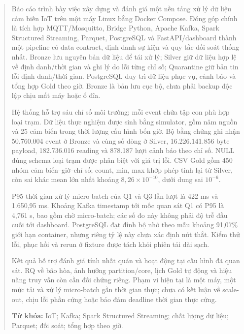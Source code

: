 \begin{abstract}
Báo cáo trình bày việc xây dựng và đánh giá một nền tảng xử lý dữ liệu cảm
biến IoT trên một máy Linux bằng Docker Compose. Đóng góp chính là tích hợp
MQTT/Mosquitto, Bridge Python, Apache Kafka, Spark Structured Streaming,
Parquet, PostgreSQL và FastAPI/dashboard thành một pipeline có data
contract, định danh sự kiện và quy tắc đối soát thống nhất. Bronze lưu
nguyên bản dữ liệu để tái xử lý; Silver giữ dữ liệu hợp lệ về định danh/thời
gian và ghi lý do lỗi từng chỉ số; Quarantine giữ bản tin lỗi định danh/thời
gian. PostgreSQL duy trì dữ liệu phục vụ, cảnh báo và tổng hợp Gold theo giờ.
Bronze là bản lưu cục bộ, chưa phải backup độc lập chịu mất máy hoặc ổ đĩa.

Hệ thống hỗ trợ sáu chỉ số môi trường; mỗi event chứa tập con phù hợp loại
trạm. Dữ liệu thực nghiệm được sinh bằng simulator, gồm năm nguồn và
25 cảm biến trong thời lượng cấu hình bốn giờ. Bộ bằng chứng ghi nhận
50.760.004 event ở Bronze và cùng số dòng ở Silver, 16.226.141.856 byte
payload, 182.736.016 reading và 878.187 lượt cảnh báo theo chỉ số. NULL
đúng schema loại trạm được phân biệt với giá trị lỗi. CSV Gold gồm
450 nhóm cảm biến--giờ--chỉ số; count, min, max khớp phép tính lại từ Silver,
còn sai khác mean lớn nhất khoảng $8,26\times10^{-10}$, dưới dung sai $10^{-6}$.

P95 thời gian xử lý micro-batch của Q1 và Q3 lần lượt là 422 ms và
1.650,95 ms. Khoảng Kafka timestamp tới mốc quan sát Q1 có P95 là 4,761 s,
bao gồm chờ micro-batch; các số đo này không phải độ trễ đầu cuối tới
dashboard. PostgreSQL đạt đỉnh bộ nhớ theo mẫu khoảng 91,07\% giới hạn
container, nhưng riêng tỷ lệ này chưa xác định nút thắt. Kiểm thử lỗi,
phục hồi và rerun ở fixture được tách khỏi phiên tải dài sạch.

Kết quả hỗ trợ đánh giá tính nhất quán và hoạt động tại cấu hình đã quan
sát. RQ về bão hòa, ảnh hưởng partition/core, lịch Gold tự động và hiệu năng
truy vấn còn cần đối chứng riêng. Phạm vi hiện tại là một máy, một mức tải
và xử lý micro-batch gần thời gian thực; chưa có kết luận về scale-out,
chịu lỗi phần cứng hoặc bảo đảm deadline thời gian thực cứng.

\medskip
\noindent\textbf{Từ khóa:} IoT; Kafka; Spark Structured Streaming; chất lượng dữ liệu;
Parquet; đối soát; tổng hợp theo giờ.
\end{abstract}
